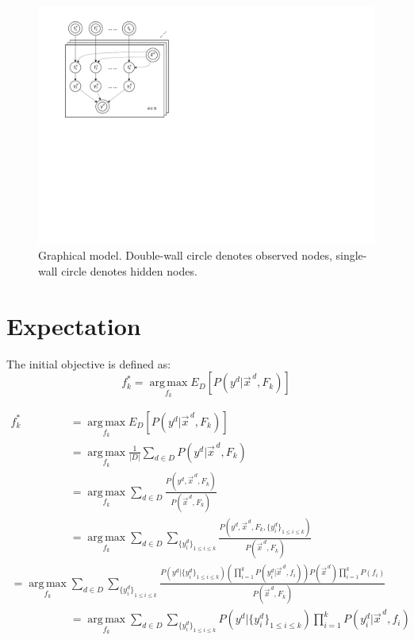 \documentclass[11pt,a4paper]{article}
\begin{document}
\begin{figure}[htbp]
	\centering
	\includegraphics[scale=1]{Plots_1.pdf}
	\caption{Graphical model. Double-wall circle denotes observed nodes, single-wall circle denotes hidden nodes.}
	\label{fig:model}
\end{figure}

\section{Expectation}
The initial objective is defined as:
\[f_k^*=\operatorname*{arg\,max}_{f_k}E_D\left[P\left(y^d|\vec{x}^{\,d},F_k\right)\right]\]

\begin{align}
f_k^*&=\operatorname*{arg\,max}_{f_k}E_D\left[P\left(y^d|\vec{x}^{\,d},F_k\right)\right]\nonumber\\
&=\operatorname*{arg\,max}_{f_k}\frac{1}{|D|}\sum_{d\in D} P\left(y^d | \vec{x}^{\,d},F_k\right)\nonumber\\
&=\operatorname*{arg\,max}_{f_k}\sum_{d\in D}\frac{P\left(y^d,\vec{x}^{\,d},F_k\right)}{P\left(\vec{x}^{\,d},F_k\right)}\nonumber\\
&=\operatorname*{arg\,max}_{f_k}\sum_{d\in D}\sum_{\{y_{i}^d\}_{1\leq i\leq k}}\frac{P\left(y^d,\vec{x}^{\,d},F_k,\{y_{i}^d\}_{1\leq i\leq k}\right)}{P\left(\vec{x}^{\,d},F_k\right)}\nonumber\\
=\operatorname*{arg\,max}_{f_k}&\sum_{d \in D}\sum_{{\{y_{i}^d\}}_{1\leq i\leq k}}\frac{P\left(y^d|\{y^d_i\}_{1\leq i\leq k}\right)\left(\prod_{i=1}^kP\left(y_i^d|\vec{x}^{\,d}, f_i\right)\right)P\left(\vec{x}^{\,d}\right)\prod_{i=1}^kP\left(f_i\right)}{P\left(\vec{x}^{\,d},F_k\right)}\nonumber\\
&=\operatorname*{arg\,max}_{f_k}\sum_{d\in D}\sum_{\{y_i^d\}_{1\leq i\leq k}}P\left(y^d|\{y^d_i\}_{1\leq i\leq k}\right)\prod_{i=1}^kP\left(y_i^d|\vec{x}^{\,d},f_i\right)\label{eq:expect}
\end{align}
\end{document}

